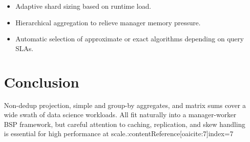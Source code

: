 \documentclass[11pt]{article}
\begin{document}
\begin{itemize}[itemsep=0pt]
  \item Adaptive shard sizing based on runtime load.
  \item Hierarchical aggregation to relieve manager memory pressure.
  \item Automatic selection of approximate or exact algorithms depending on query SLAs.
\end{itemize}

\section*{Conclusion}

Non-dedup projection, simple and group-by aggregates, and matrix sums cover a wide swath of data science workloads.  All fit naturally into a manager-worker BSP framework, but careful attention to caching, replication, and skew handling is essential for high performance at scale.:contentReference[oaicite:7]{index=7}
\end{document}
